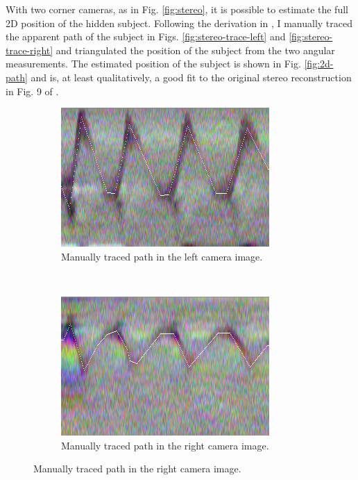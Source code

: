 \documentclass{article}
\begin{document}
With two corner cameras, as in Fig. \ref{fig:stereo}, it is possible to estimate the full 2D position of the hidden subject. Following the derivation in \cite{bouman_turningcornerscameras2017}, I manually traced the apparent path of the subject in Figs. \ref{fig:stereo-trace-left} and \ref{fig:stereo-trace-right} and triangulated the position of the subject from the two angular measurements. The estimated position of the subject is shown in Fig. \ref{fig:2d-path} and is, at least qualitatively, a good fit to the original stereo reconstruction in Fig. 9 of \cite{bouman_turningcornerscameras2017}. 

\begin{figure}[htbp]
	\centering
	\begin{subfigure}[t]{0.45\textwidth}
		\includegraphics[width=\textwidth]{img/stereo_draw_1.png}
		\caption{Manually traced path in the left camera image.}
	\end{subfigure}
	~
	\begin{subfigure}[t]{0.45\textwidth}
		\includegraphics[width=\textwidth]{img/stereo_draw_2.png}
		\caption{Manually traced path in the right camera image.}
	\end{subfigure}


\end{figure}
\end{document}
